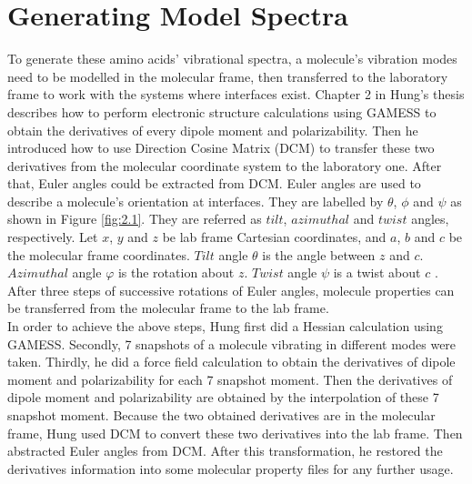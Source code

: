 \section{Generating Model Spectra}
To generate these amino acids' vibrational spectra, a molecule's vibration modes need to be modelled in the molecular frame, then transferred to the laboratory frame to work with the systems where interfaces exist. Chapter 2 in Hung's thesis \cite{KuoKaiHung:Thesis:2015} describes how to perform electronic structure calculations using GAMESS \cite{GAMESS} to obtain the derivatives of every dipole moment and polarizability. Then he introduced how to use Direction Cosine Matrix (DCM) to transfer these two derivatives from the molecular coordinate system to the laboratory one. After that, Euler angles could be extracted from DCM. Euler angles are used to describe a molecule's orientation at interfaces. They are labelled by $\theta$, $\phi$ and $\psi$ as shown in Figure \ref{fig:2.1}. They are referred as $tilt$, $azimuthal$ and $twist$ angles, respectively. Let $x$, $y$ and $z$ be lab frame Cartesian coordinates, and $a$, $b$ and $c$ be the molecular frame coordinates. $Tilt$ angle $\theta$ is the angle between $z$ and $c$. $Azimuthal$ angle $\varphi$ is the rotation about $z$. $Twist$ angle $\psi$ is a twist about $c$ \cite{hore0033-rotations}. After three steps of successive rotations of Euler angles, molecule properties can be transferred from the molecular frame to the lab frame. \\

In order to achieve the above steps, Hung first did a Hessian calculation using GAMESS. Secondly, 7 snapshots of a molecule vibrating in different modes were taken. Thirdly, he did a force field calculation to obtain the derivatives of dipole moment and polarizability for each 7 snapshot moment. Then the derivatives of dipole moment and polarizability are obtained by the interpolation of these 7 snapshot moment. Because the two obtained derivatives are in the molecular frame, Hung used DCM to convert these two derivatives into the lab frame. Then abstracted Euler angles from DCM. After this transformation, he restored the derivatives information into some molecular property files for any further usage. \\

